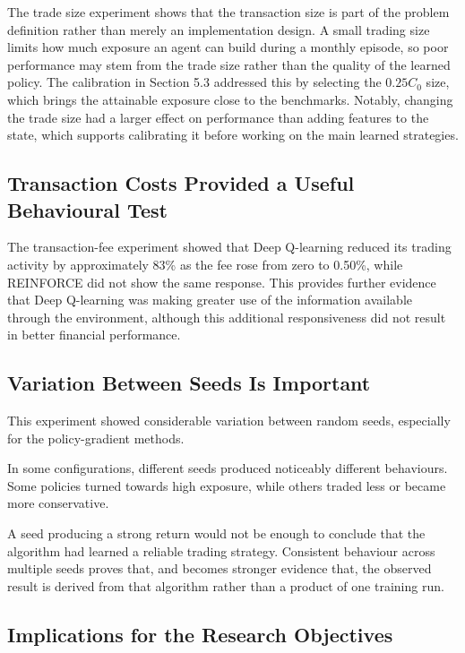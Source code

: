 The trade size experiment shows that the transaction size is part of the
problem definition rather than merely an implementation design. A small
trading size limits how much exposure an agent can build during a
monthly episode, so poor performance may stem from the trade size rather
than the quality of the learned policy. The calibration in Section 5.3
addressed this by selecting the \(0.25C_{0}\) size, which brings the
attainable exposure close to the benchmark\textquotesingle s. Notably,
changing the trade size had a larger effect on performance than adding
features to the state, which supports calibrating it before working on
the main learned strategies.

\subsection{Transaction Costs Provided a Useful Behavioural Test}

The transaction-fee experiment showed that Deep Q-learning reduced its
trading activity by approximately 83\% as the fee rose from zero to
0.50\%, while REINFORCE did not show the same response. This provides
further evidence that Deep Q-learning was making greater use of the
information available through the environment, although this additional
responsiveness did not result in better financial performance.

\subsection{Variation Between Seeds Is Important}

This experiment showed considerable variation between random seeds,
especially for the policy-gradient methods.

In some configurations, different seeds produced noticeably different
behaviours. Some policies turned towards high exposure, while others
traded less or became more conservative.

A seed producing a strong return would not be enough to conclude that
the algorithm had learned a reliable trading strategy. Consistent
behaviour across multiple seeds proves that, and becomes stronger
evidence that, the observed result is derived from that algorithm rather
than a product of one training run.

\subsection{Implications for the Research Objectives}

